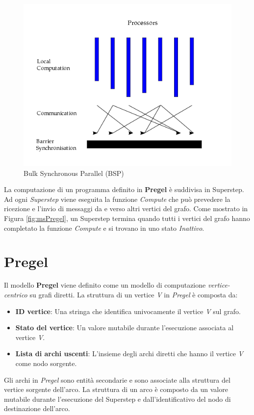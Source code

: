 \documentclass[LaM,binding=0.6cm]{sapthesis}
\begin{document}
\begin{figure}
\centering
\includegraphics[width=1\textwidth]{BSP}
\caption{Bulk Synchronous Parallel (BSP) \cite{1_wikipedia_2015}}
\label{fig:BSP}
\end{figure}

La computazione di un programma definito in \textbf{Pregel} \cite{Malewicz:2010:PSL:1807167.1807184} è suddivisa in Superstep. Ad ogni \textit{Superstep} viene eseguita la funzione \textit{Compute} che può prevedere la ricezione e l'invio di messaggi da e verso altri vertici del grafo. Come mostrato in Figura \ref{fig:msPregel}, un Superstep termina quando tutti i vertici del grafo hanno completato la funzione \textit{Compute} e si trovano in uno stato \textit{Inattivo}.

\section{Pregel}

Il modello \textbf{Pregel} viene definito come un modello di computazione \textit{vertice-centrico} su grafi diretti. 
La struttura di un vertice \textit{V} in \textit{Pregel} è composta da:
\begin{itemize}
\item \textbf{ID vertice}: Una stringa che identifica univocamente il vertice \textit{V} sul grafo.
\item \textbf{Stato del vertice}: Un valore mutabile durante l'esecuzione associata al vertice \textit{V}.
\item \textbf{Lista di archi uscenti}: L'insieme degli archi diretti che hanno il vertice \textit{V} come nodo sorgente.
\end{itemize}
Gli archi in \textit{Pregel} sono entità secondarie e sono associate alla struttura del vertice sorgente dell'arco. La struttura di un arco è composto da un valore mutabile durante l'esecuzione del Superstep e dall'identificativo del nodo di destinazione dell'arco.
\end{document}
